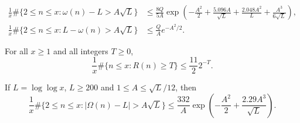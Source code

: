 \documentclass[10pt,a4paper]{amsart}
\begin{document}
    \begin{align}
        \frac{1}{x}\#\{2\le n\le x:\omega(n)-L>A\sqrt{L}\}&\le\frac{8Q}{5A}\exp\left(-\frac{A^2}{2}+\frac{5.096A}{\sqrt{L}}+\frac{2.048A^2}{L}+\frac{A^3}{6\sqrt{L}}\right),\label{eqn:omega_upper_window}\\
        \frac{1}{x}\#\{2\le n\le x:L-\omega(n)>A\sqrt{L}\}&\le\frac{Q}{A}e^{-A^2/2}.\label{eqn:omega_lower_window}
    \end{align}

\begin{prpstn}\label{prop:R_tail}
    For all $x\ge 1$ and all integers $T\ge 0$,
    \begin{equation}\label{eqn:R_tail}
        \frac{1}{x}\#\{n\le x:R(n)\ge T\}\le\frac{11}{2}2^{-T}.
    \end{equation}
\end{prpstn}

\begin{prpstn}\label{prop:gaussian_Omega}
    If $L=\log\log x$, $L\ge 200$ and $1\le A\le\sqrt{L}/12$, then
    \begin{equation}\label{eqn:Omega_window}
        \frac{1}{x}\#\{2\le n\le x:|\Omega(n)-L|>A\sqrt{L}\}\le\frac{332}{A}\exp\left(-\frac{A^2}{2}+\frac{2.29A^3}{\sqrt{L}}\right).
    \end{equation}
\end{prpstn}
\end{document}
